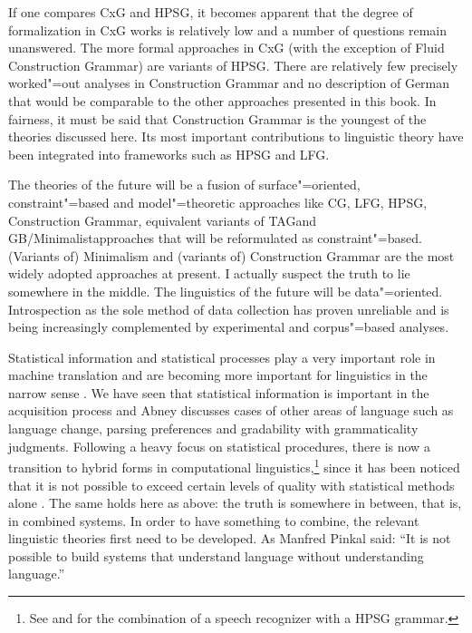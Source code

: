 If one compares CxG and HPSG, it becomes apparent that the degree of formalization in CxG works is relatively low and a number of questions remain
unanswered. The more formal approaches in CxG (with the exception of Fluid Construction Grammar) are variants of HPSG. There are relatively few precisely worked"=out analyses in Construction Grammar
and no description of German that would be comparable to the other approaches presented in this book. In fairness, it must be said that Construction Grammar
is the youngest of the theories discussed here. Its most important contributions to linguistic theory have been integrated into frameworks such as HPSG and LFG.

The theories of the future will be a fusion of surface"=oriented, constraint"=based and
model"=theoretic approaches like CG\indexcg, LFG\indexlfg, HPSG\indexhpsg,
Construction Grammar\indexcxg, equivalent variants of TAG\indextag and GB/Minimalist\indexgb\indexmp approaches that will be reformulated as constraint"=based.
(Variants of) Minimalism and (variants of) Construction Grammar are the most widely adopted approaches at present. I actually suspect the truth to lie somewhere
in the middle. The linguistics of the future will be data"=oriented. Introspection as the sole method of data collection
has proven unreliable \citep{Mueller2007c,MM2009a} and is being increasingly complemented by experimental and corpus"=based analyses.

Statistical information and statistical processes play a very important role in machine translation and are becoming more important
for linguistics in the narrow sense
\citep{Abney96a}. We
have seen that statistical information is important in the acquisition process and Abney discusses cases of other
areas of language such as language change, parsing preferences and gradability with grammaticality judgments.
Following a heavy focus on statistical procedures, there is now a transition to hybrid forms in computational linguistics,\footnote{
See  and  for the combination of a speech recognizer with a HPSG grammar.
}
since it has been noticed that it is not possible to exceed certain levels of quality with statistical methods alone \citep{Steedman2011a,Church2011a,Kay2011a}. 
The same holds here as above: the truth is somewhere in between, that is, in combined systems. In order to have something to combine, the relevant linguistic theories first
need to be developed. As Manfred Pinkal said: ``It is not possible to build systems that understand language without understanding language.''


